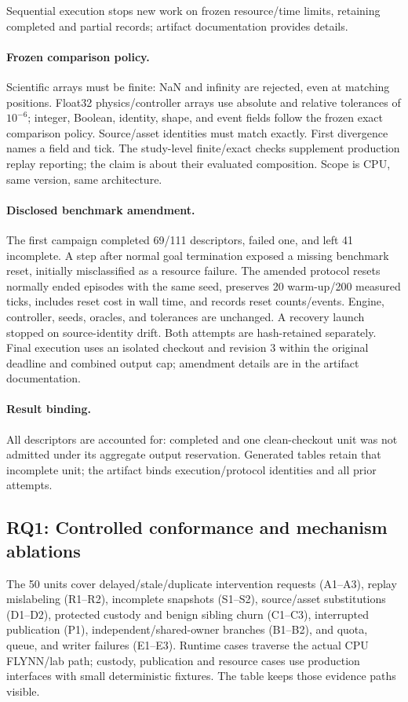 \documentclass[10pt]{article}
\begin{document}
Sequential execution stops new work on frozen resource/time limits, retaining
completed and partial records; artifact documentation provides details.

\paragraph{Frozen comparison policy.}
Scientific arrays must be finite: NaN and infinity are rejected, even at matching
positions. Float32 physics/controller arrays use absolute and relative tolerances
of $10^{-6}$; integer, Boolean, identity, shape, and event fields follow the
frozen exact comparison policy. Source/asset identities must match exactly.
First divergence names a field and tick. The study-level finite/exact checks
supplement production replay reporting; the claim is about their evaluated
composition. Scope is CPU, same version, same architecture.

\paragraph{Disclosed benchmark amendment.}
The first campaign completed 69/111 descriptors, failed one, and left 41
incomplete. A step after normal goal termination exposed a missing benchmark
reset, initially misclassified as a resource failure. The amended protocol
resets normally ended episodes with the same seed, preserves 20 warm-up/200
measured ticks, includes reset cost in wall time, and records reset counts/events. Engine, controller, seeds, oracles,
and tolerances are unchanged. A recovery launch stopped on source-identity
drift. Both attempts are hash-retained separately. Final execution uses an
isolated checkout and revision 3 within the original deadline and combined
output cap; amendment details are in the artifact documentation.

\paragraph{Result binding.}
All \StudyDeclaredUnits{} descriptors are accounted for:
\StudyCompletedUnits{} completed and one clean-checkout unit was not admitted
under its aggregate output reservation. Generated tables retain that incomplete
unit; the artifact binds execution/protocol identities and all prior attempts.

\subsection{RQ1: Controlled conformance and mechanism ablations}
The 50 units cover delayed/stale/duplicate intervention requests (A1--A3), replay
mislabeling (R1--R2), incomplete snapshots (S1--S2), source/asset substitutions
(D1--D2), protected custody and benign sibling churn (C1--C3), interrupted
publication (P1), independent/shared-owner branches (B1--B2), and quota, queue,
and writer failures (E1--E3). Runtime cases traverse the actual CPU FLYNN/lab
path; custody, publication and resource cases use production interfaces with
small deterministic fixtures. The table keeps those evidence paths visible.
\end{document}
